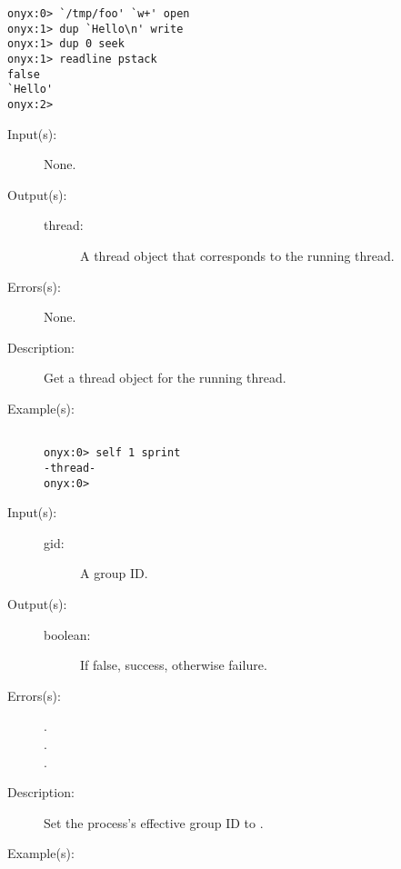 \begin{description}
\begin{description}
\begin{verbatim}
onyx:0> `/tmp/foo' `w+' open
onyx:1> dup `Hello\n' write
onyx:1> dup 0 seek
onyx:1> readline pstack
false
`Hello'
onyx:2>
		\end{verbatim}
	\end{description}
\label{systemdict:self}
\item[{\onyxop{--}{self}{thread}}: ]
	\begin{description}\item[]
	\item[Input(s): ] None.
	\item[Output(s): ]
		\begin{description}\item[]
		\item[thread: ]
			A thread object that corresponds to the running thread.
		\end{description}
	\item[Errors(s): ] None.
	\item[Description: ]
		Get a thread object for the running thread.
	\item[Example(s): ]\begin{verbatim}

onyx:0> self 1 sprint
-thread-
onyx:0>
		\end{verbatim}
	\end{description}
\label{systemdict:setegid}
\item[{\onyxop{gid}{setegid}{boolean}}: ]
	\begin{description}\item[]
	\item[Input(s): ]
		\begin{description}\item[]
		\item[gid: ]
			A group ID.
		\end{description}
	\item[Output(s): ]
		\begin{description}\item[]
		\item[boolean: ]
			If false, success, otherwise failure.
		\end{description}
	\item[Errors(s): ]
		\begin{description}\item[]
		\item[.]
		\item[.]
		\item[.]
		\end{description}
	\item[Description: ]
		Set the process's effective group ID to .
	\item[Example(s): ]\begin{verbatim}


\end{verbatim}
\end{description}
\end{description}
